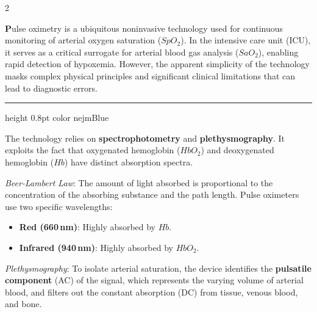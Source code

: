 \documentclass[9pt,a4paper]{article}
\newcommand{\dropcap}[1]{{\color{nejmBlue}\fontsize{24}{28}\selectfont\bfseries #1}}
\newcommand{\sectionheader}[1]{%
    \vspace{0.3cm}
    \noindent{\headerfont\small\textcolor{nejmBlue}{\MakeUppercase{#1}}}%
    \par\vspace{1pt}\hrule height 0.8pt color nejmBlue
    \vspace{0.15cm}
}
\begin{document}
\begin{multicols}{2}

\dropcap{P}ulse oximetry is a ubiquitous noninvasive technology used for continuous monitoring of arterial oxygen saturation ($SpO_2$). In the intensive care unit (ICU), it serves as a critical surrogate for arterial blood gas analysis ($SaO_2$), enabling rapid detection of hypoxemia. However, the apparent simplicity of the technology masks complex physical principles and significant clinical limitations that can lead to diagnostic errors.

\sectionheader{Physiological Principles}
The technology relies on \textbf{spectrophotometry} and \textbf{plethysmography}. It exploits the fact that oxygenated hemoglobin ($HbO_2$) and deoxygenated hemoglobin ($Hb$) have distinct absorption spectra. 

\textit{Beer-Lambert Law}: The amount of light absorbed is proportional to the concentration of the absorbing substance and the path length. Pulse oximeters use two specific wavelengths:
\begin{itemize}
    \setlength{\itemsep}{0pt}
    \item \textbf{Red (660\,nm)}: Highly absorbed by $Hb$.
    \item \textbf{Infrared (940\,nm)}: Highly absorbed by $HbO_2$.
\end{itemize}

\textit{Plethysmography}: To isolate arterial saturation, the device identifies the \textbf{pulsatile component} (AC) of the signal, which represents the varying volume of arterial blood, and filters out the constant absorption (DC) from tissue, venous blood, and bone.

\vspace{0.3cm}
\begin{center}
\end{center}


\end{multicols}
\end{document}
